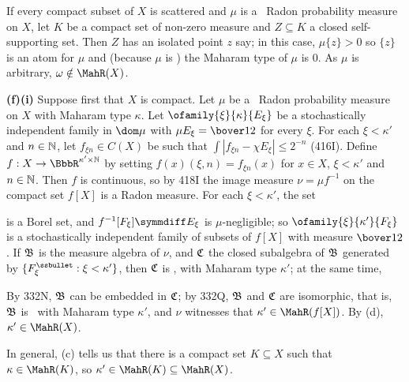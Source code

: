 { If every compact subset of $X$ is scattered and $\mu$ is
a \Mth\ Radon
probability measure on $X$, let $K$ be a compact set of non-zero measure
and $Z\subseteq K$ a closed self-supporting set.   Then $Z$
has an isolated point $z$ say;  in this case, $\mu\{z\}>0$ so $\{z\}$ is
an atom for $\mu$ and (because $\mu$ is \Mth) the Maharam type of $\mu$
is $0$.   As $\mu$ is arbitrary, $\omega\notin\MahR(X)$.

\medskip

{\bf (f)(i)} Suppose first that $X$ is compact.   Let $\mu$ be a \Mth\
Radon probability measure on $X$ with Maharam type $\kappa$.   Let
$\ofamily{\xi}{\kappa}{E_{\xi}}$ be a stochastically independent family
in $\dom\mu$ with
$\mu E_{\xi}=\bover12$ for every $\xi$.   For each $\xi<\kappa'$ and
$n\in\Bbb N$, let $f_{\xi n}\in C(X)$ be such that
$\int|f_{\xi n}-\chi E_{\xi}|\le 2^{-n}$ (416I).   Define
$f:X\to\BbbR^{\kappa'\times\Bbb N}$ by setting
$f(x)(\xi,n)=f_{\xi n}(x)$ for $x\in X$, $\xi<\kappa'$ and $n\in\Bbb N$.
Then $f$ is continuous, so by 418I the image measure $\nu=\mu f^{-1}$ on
the compact set $f[X]$ is a Radon measure.   For each $\xi<\kappa'$, the
set


\noindent is a Borel set, and $f^{-1}[F_{\xi}]\symmdiff E_{\xi}$ is
$\mu$-negligible;  so $\ofamily{\xi}{\kappa'}{F_{\xi}}$ is a
stochastically independent family of subsets of $f[X]$ with measure
$\bover12$.   If $\frak B$ is the measure algebra of $\nu$, and
$\frak C$ the closed subalgebra of $\frak B$ generated by
$\{F_{\xi}^{\ssbullet}:\xi<\kappa'\}$, then $\frak C$ is \Mth, with
Maharam type $\kappa'$;  at the same time,


\noindent By 332N, $\frak B$ can be embedded in $\frak C$;  by 332Q,
$\frak B$ and $\frak C$ are isomorphic, that is, $\frak B$ is \Mth\ with
Maharam type $\kappa'$, and $\nu$ witnesses that
$\kappa'\in\MahR(f[X])$.   By (d), $\kappa'\in\MahR(X)$.

\medskip

 In general, (c) tells us that there is a compact set
$K\subseteq X$ such that $\kappa\in\MahR(K)$, so
$\kappa'\in\MahR(K)\subseteq\MahR(X)$.

\medskip

}
